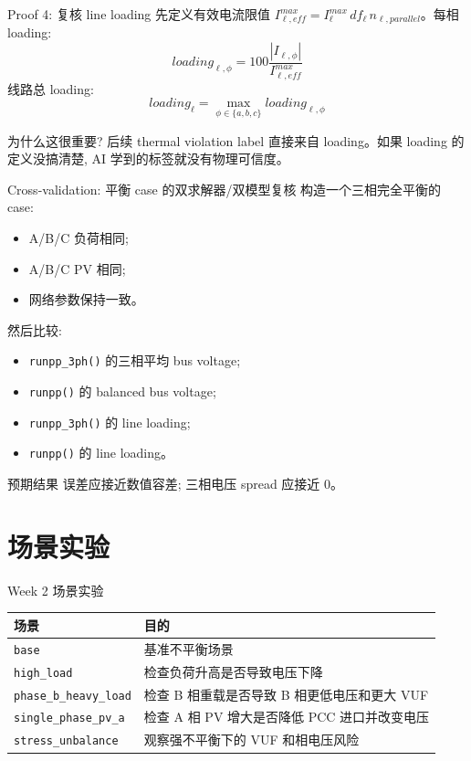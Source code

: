 \documentclass[aspectratio=169,10pt]{ctexbeamer}
\newcommand{\code}[1]{\texttt{#1}}
\begin{document}
\begin{frame}{Proof 4: 复核 line loading}
先定义有效电流限值 $I_{\ell,eff}^{max}=I_\ell^{max}\,df_\ell\,n_{\ell,parallel}$。每相 loading:
\[
loading_{\ell,\phi}=100\frac{|I_{\ell,\phi}|}{I_{\ell,eff}^{max}}
\]
线路总 loading:
\[
loading_\ell=\max_{\phi\in\{a,b,c\}}loading_{\ell,\phi}
\]
\vspace{0.5em}
\begin{block}{为什么这很重要?}
后续 thermal violation label 直接来自 loading。如果 loading 的定义没搞清楚, AI 学到的标签就没有物理可信度。
\end{block}
\end{frame}

\begin{frame}{Cross-validation: 平衡 case 的双求解器/双模型复核}
构造一个三相完全平衡的 case:
\begin{itemize}
  \item A/B/C 负荷相同;
  \item A/B/C PV 相同;
  \item 网络参数保持一致。
\end{itemize}
\vspace{0.3em}
然后比较:
\begin{itemize}
  \item \code{runpp\_3ph()} 的三相平均 bus voltage;
  \item \code{runpp()} 的 balanced bus voltage;
  \item \code{runpp\_3ph()} 的 line loading;
  \item \code{runpp()} 的 line loading。
\end{itemize}
\begin{alertblock}{预期结果}
误差应接近数值容差; 三相电压 spread 应接近 0。
\end{alertblock}
\end{frame}

\section{场景实验}

\begin{frame}{Week 2 场景实验}
\begin{tabular}{p{}p{}}
\toprule
场景 & 目的 \\
\midrule
\code{base} & 基准不平衡场景 \\
\code{high\_load} & 检查负荷升高是否导致电压下降 \\
\code{phase\_b\_heavy\_load} & 检查 B 相重载是否导致 B 相更低电压和更大 VUF \\
\code{single\_phase\_pv\_a} & 检查 A 相 PV 增大是否降低 PCC 进口并改变电压 \\
\code{stress\_unbalance} & 观察强不平衡下的 VUF 和相电压风险 \\
\bottomrule
\end{tabular}
\end{frame}
\end{document}
